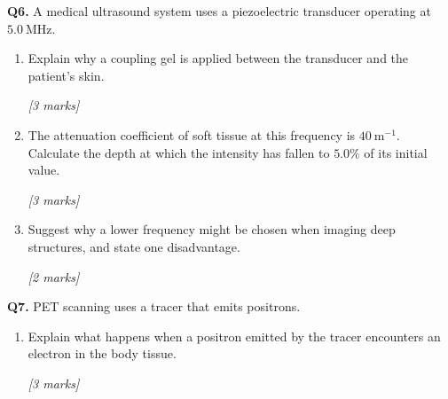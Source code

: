 \begin{tcolorbox}[colback=white, colframe=midblue, breakable]

\begin{minipage}{\linewidth}
\textbf{Q6.} A medical ultrasound system uses a piezoelectric transducer operating at $5.0\ \text{MHz}$.
\end{minipage}

\begin{enumerate}[label=(\alph*)]
  \item \begin{minipage}[t]{\linewidth}
  Explain why a coupling gel is applied between the transducer and the patient's skin.
  \par\hfill\textit{[3 marks]}
  \vspace{3.5cm}
  \end{minipage}

  \item \begin{minipage}[t]{\linewidth}
  The attenuation coefficient of soft tissue at this frequency is $40\ \text{m}^{-1}$. Calculate the depth at which the intensity has fallen to $5.0\%$ of its initial value.
  \par\hfill\textit{[3 marks]}
  \vspace{4.0cm}
  \end{minipage}

  \item \begin{minipage}[t]{\linewidth}
  Suggest why a lower frequency might be chosen when imaging deep structures, and state one disadvantage.
  \par\hfill\textit{[2 marks]}
  \vspace{2.5cm}
  \end{minipage}
\end{enumerate}

\begin{minipage}{\linewidth}
\textbf{Q7.} PET scanning uses a tracer that emits positrons.
\end{minipage}

\begin{enumerate}[label=(\alph*)]
  \item \begin{minipage}[t]{\linewidth}
  Explain what happens when a positron emitted by the tracer encounters an electron in the body tissue.
  \par\hfill\textit{[3 marks]}
  \vspace{3.5cm}
  \end{minipage}


\end{enumerate}
\end{tcolorbox}
